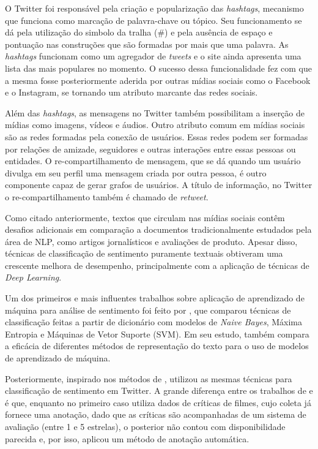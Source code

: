 O Twitter foi responsável pela criação e popularização das \textit{hashtags},
mecanismo que funciona como marcação de palavra-chave ou tópico.
Seu funcionamento se dá pela utilização do simbolo da tralha (\#) e pela ausência
de espaço e pontuação nas construções que são formadas por mais que uma palavra.
As \textit{hashtags} funcionam como um agregador de \textit{tweets} e o site
ainda apresenta uma lista das mais populares no momento.
O sucesso dessa funcionalidade fez com que a mesma fosse posteriormente aderida
por outras mídias sociais como o Facebook e o Instagram, se tornando um
atributo marcante das redes sociais.

Além das \textit{hashtags}, as mensagens no Twitter também possibilitam a
inserção de mídias como imagens, vídeos e áudios.
Outro atributo comum em mídias sociais são as redes formadas pela conexão de
usuários.
Essas redes podem ser formadas por relações de amizade, seguidores e outras
interações entre essas pessoas ou entidades.
O re-compartilhamento de mensagem, que se dá quando um usuário divulga em seu
perfil uma mensagem criada por outra pessoa, é outro componente capaz de gerar
grafos de usuários.
A título de informação, no Twitter o re-compartilhamento também é chamado de
\textit{retweet}.

Como citado anteriormente, textos que circulam nas mídias sociais contêm
desafios adicionais em comparação a documentos tradicionalmente estudados pela
área de NLP, como artigos jornalísticos e avaliações de produto.
Apesar disso, técnicas de classificação de sentimento puramente textuais
obtiveram uma crescente melhora de desempenho, principalmente com a aplicação de
técnicas de \textit{Deep Learning}.

Um dos primeiros e mais influentes trabalhos sobre aplicação de aprendizado de
máquina para análise de sentimento foi feito por \citet{pang02}, que comparou
técnicas de classificação feitas a partir de dicionário com modelos de
\textit{Naive Bayes}, Máxima Entropia e Máquinas de Vetor Suporte (SVM).
Em seu estudo, \citet{pang02} também compara a eficácia de diferentes métodos
de representação do texto para o uso de modelos de aprendizado de máquina.

Posteriormente, inspirado nos métodos de \citet{pang02}, \citet{go09} utilizou
as mesmas técnicas para classificação de sentimento em Twitter.
A grande diferença entre os trabalhos de \citet{pang02} e \citet{go09} é que,
enquanto no primeiro caso utiliza dados de críticas de filmes, cujo coleta já
fornece uma anotação, dado que as críticas são acompanhadas de um sistema de
avaliação (entre 1 e 5 estrelas), o posterior
não contou com disponibilidade parecida e, por isso, aplicou um método de
anotação automática.

